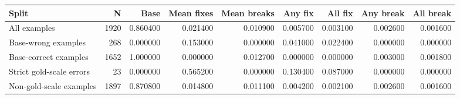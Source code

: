 \begin{tabular}{lrrrrrrrr}
\toprule
Split & N & Base & Mean fixes & Mean breaks & Any fix & All fix & Any break & All break \\
\midrule
All examples & 1920 & 0.860400 & 0.021400 & 0.010900 & 0.005700 & 0.003100 & 0.002600 & 0.001600 \\
Base-wrong examples & 268 & 0.000000 & 0.153000 & 0.000000 & 0.041000 & 0.022400 & 0.000000 & 0.000000 \\
Base-correct examples & 1652 & 1.000000 & 0.000000 & 0.012700 & 0.000000 & 0.000000 & 0.003000 & 0.001800 \\
Strict gold-scale errors & 23 & 0.000000 & 0.565200 & 0.000000 & 0.130400 & 0.087000 & 0.000000 & 0.000000 \\
Non-gold-scale examples & 1897 & 0.870800 & 0.014800 & 0.011100 & 0.004200 & 0.002100 & 0.002600 & 0.001600 \\
\bottomrule
\end{tabular}
